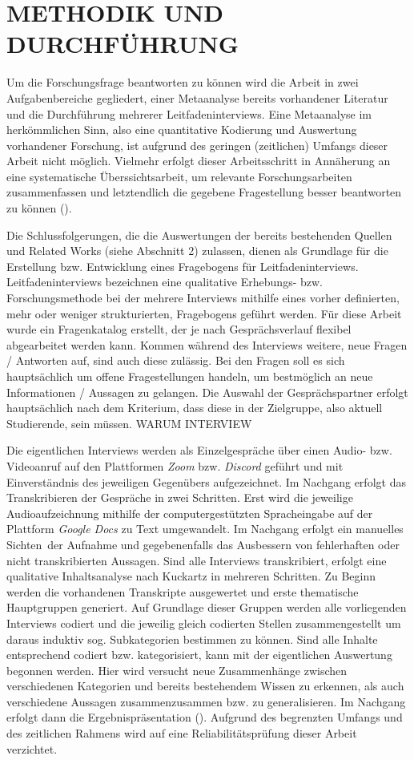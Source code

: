 \documentclass[10pt]{article}
\newcommand{\zit}[1]{(\cite{#1})}
\begin{document}
\section{METHODIK UND DURCHFÜHRUNG}
Um die Forschungsfrage beantworten zu können wird die Arbeit in zwei Aufgabenbereiche gegliedert, einer Metaanalyse bereits vorhandener Literatur und die Durchführung mehrerer Leitfadeninterviews. 
Eine Metaanalyse im herkömmlichen Sinn, also eine quantitative Kodierung und Auswertung vorhandener Forschung, ist aufgrund des geringen (zeitlichen) Umfangs dieser Arbeit nicht möglich. Vielmehr erfolgt dieser Arbeitsschritt in Annäherung an eine systematische Überssichtsarbeit, um relevante Forschungsarbeiten zusammenfassen und letztendlich die gegebene Fragestellung besser beantworten zu können \zit{Metaanalyse}.

Die Schlussfolgerungen, die die Auswertungen der bereits bestehenden Quellen und Related Works (siehe Abschnitt 2) zulassen, dienen als Grundlage für die Erstellung bzw. Entwicklung eines Fragebogens für Leitfadeninterviews. Leitfadeninterviews bezeichnen eine qualitative Erhebungs- bzw. Forschungsmethode bei der mehrere Interviews mithilfe eines vorher definierten, mehr oder weniger strukturierten, Fragebogens geführt werden. Für diese Arbeit wurde ein Fragenkatalog erstellt, der je nach Gesprächsverlauf flexibel abgearbeitet werden kann. Kommen während des Interviews weitere, neue Fragen / Antworten auf, sind auch diese zulässig. Bei den Fragen soll es sich hauptsächlich um offene Fragestellungen handeln, um bestmöglich an neue Informationen / Aussagen zu gelangen.
Die Auswahl der Gesprächspartner erfolgt hauptsächlich nach dem Kriterium, dass diese in der Zielgruppe, also aktuell Studierende, sein müssen.  WARUM INTERVIEW

Die eigentlichen Interviews werden als Einzelgespräche über einen Audio- bzw. Videoanruf auf den Plattformen \textit{Zoom} bzw. \textit{Discord} geführt und mit Einverständnis des jeweiligen Gegenübers aufgezeichnet. 
Im Nachgang erfolgt das Transkribieren der Gespräche in zwei Schritten. Erst wird die jeweilige Audioaufzeichnung mithilfe der computergestützten Spracheingabe auf der Plattform \textit{Google Docs} zu Text umgewandelt. Im Nachgang erfolgt ein manuelles \grqq Sichten\grqq\ der Aufnahme und gegebenenfalls das Ausbessern von fehlerhaften oder nicht transkribierten Aussagen. 
Sind alle Interviews transkribiert, erfolgt eine qualitative Inhaltsanalyse nach Kuckartz in mehreren Schritten. Zu Beginn werden die vorhandenen Transkripte ausgewertet und erste thematische Hauptgruppen generiert. Auf Grundlage dieser Gruppen werden alle vorliegenden Interviews codiert und die jeweilig gleich codierten Stellen zusammengestellt um daraus induktiv sog. Subkategorien bestimmen zu können. Sind alle Inhalte entsprechend codiert bzw. kategorisiert, kann mit der eigentlichen Auswertung begonnen werden. Hier wird versucht neue Zusammenhänge zwischen verschiedenen Kategorien und bereits bestehendem Wissen zu erkennen, als auch verschiedene Aussagen zusammenzusammen bzw. zu generalisieren. Im Nachgang erfolgt dann die Ergebnispräsentation \zit{Inhaltsanalyse}. Aufgrund des begrenzten Umfangs und des zeitlichen Rahmens wird auf eine Reliabilitätsprüfung dieser Arbeit verzichtet.
\end{document}

